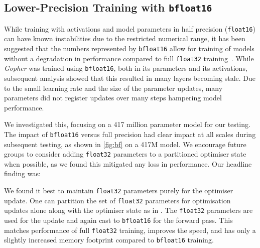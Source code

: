 \documentclass[11pt, a4paper, logo, internal, copyright, nonumbering]{deepmind}
\newenvironment{indentchunk}[1]
 {\begin{list}{}
         {\setlength{\leftmargin}{#1}}
         \item[]
 }
 {\end{list}}
\newcommand{\gopher}{\textit{Gopher}\xspace}
\begin{document}
\subsection{Lower-Precision Training with \texttt{bfloat16}}
While training with activations and model parameters in half precision (\texttt{float16}) can have known instabilities due to the restricted numerical range, it has been suggested that the numbers represented by \texttt{bfloat16} allow for training of models without a degradation in performance compared to full \texttt{float32} training~\citep{burgess2019bfloat16}. 
While \gopher was trained using \texttt{bfloat16}, both in its parameters and its activations, subsequent analysis showed that this resulted in many layers becoming stale.
Due to the small learning rate and the size of the parameter updates, many parameters did not register updates over many steps hampering model performance.

We investigated this, focusing on a 417 million parameter model for our testing.
The impact of \texttt{bfloat16} versus full precision had clear impact at all scales during subsequent testing, as shown in \autoref{fig:bf} on a 417M model.
We encourage future groups to consider adding \texttt{float32} parameters to a partitioned optimiser state when possible, as we found this mitigated any loss in performance.
Our headline finding was:

\begin{indentchunk}{1cm}
We found it best to maintain \texttt{float32} parameters purely for the optimiser update. One can partition the set of \texttt{float32} parameters for optimisation updates alone along with the optimiser state as in \citet{rajbhandari2020zero}.
The \texttt{float32} parameters are used for the update and again cast to \texttt{bfloat16} for the forward pass. This matches performance of full \texttt{float32} training, improves the speed, and has only a slightly increased memory footprint compared to \texttt{bfloat16} training.
\end{indentchunk}
\end{document}
